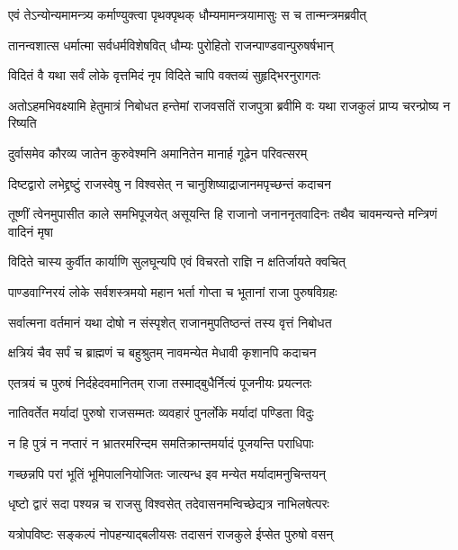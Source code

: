 
\twolineshloka
{एवं तेऽन्योन्यमामन्त्र्य कर्माण्युक्त्वा पृथक्पृथक्}
{धौम्यमामन्त्रयामासुः स च तान्मन्त्रमब्रवीत्}


\twolineshloka
{तानन्वशात्स धर्मात्मा सर्वधर्मविशेषवित्}
{धौम्यः पुरोहितो राजन्पाण्डवान्पुरुषर्षभान्}




\twolineshloka
{विदितं वै यथा सर्वं लोके वृत्तमिदं नृप}
{विदिते चापि वक्तव्यं सुहृद्भिरनुरागतः}


\threelineshloka
{अतोऽहमभिवक्ष्यामि हेतुमात्रं निबोधत}
{हन्तेमां राजवसतिं राजपुत्रा ब्रवीमि वः}
{यथा राजकुलं प्राप्य चरन्प्रोष्य न रिष्यति}


\twolineshloka
{दुर्वासमेव कौरव्य जातेन कुरुवेश्मनि}
{अमानितेन मानार्ह गूढेन परिवत्सरम्}


\twolineshloka
{दिष्टद्वारो लभेद्द्रष्टुं राजस्वेषु न विश्वसेत्}
{न चानुशिष्याद्राजानमपृच्छन्तं कदाचन}


\onelineshloka
{तूष्णीं त्वेनमुपासीत काले समभिपूजयेत्}
\twolineshloka
{असूयन्ति हि राजानो जनाननृतवादिनः}
{तथैव चावमन्यन्ते मन्त्रिणं वादिनं मृषा}


\twolineshloka
{विदिते चास्य कुर्वीत कार्याणि सुलघून्यपि}
{एवं विचरतो राज्ञि न क्षतिर्जायते क्वचित्}


\twolineshloka
{पाण्डवाग्निरयं लोके सर्वशस्त्रमयो महान}
{भर्ता गोप्ता च भूतानां राजा पुरुषविग्रहः}


\twolineshloka
{सर्वात्मना वर्तमानं यथा दोषो न संस्पृशेत्}
{राजानमुपतिष्ठन्तं तस्य वृत्तं निबोधत}


\twolineshloka
{क्षत्रियं चैव सर्पं च ब्राह्मणं च बहुश्रुतम्}
{नावमन्येत मेधावी कृशानपि कदाचन}


\twolineshloka
{एतत्रयं च पुरुषं निर्दहेदवमानितम्}
{राजा तस्माद्बुधैर्नित्यं पूजनीयः प्रयत्नतः}


\twolineshloka
{नातिवर्तेत मर्यादां पुरुषो राजसम्मतः}
{व्यवहारं पुनर्लोके मर्यादां पण्डिता विदुः}


\twolineshloka
{न हि पुत्रं न नप्तारं न भ्रातरमरिन्दम}
{समतिक्रान्तमर्यादं पूजयन्ति पराधिपाः}


\twolineshloka
{गच्छन्नपि परां भूतिं भूमिपालनियोजितः}
{जात्यन्ध इव मन्येत मर्यादामनुचिन्तयन्}


\twolineshloka
{धृष्टो द्वारं सदा पश्यन्न च राजसु विश्वसेत्}
{तदेवासनमन्विच्छेद्यत्र नाभिलषेत्परः}


\twolineshloka
{यत्रोपविष्टः सङ्कल्पं नोपहन्याद्बलीयसः}
{तदासनं राजकुले ईप्सेत पुरुषो वसन्}


